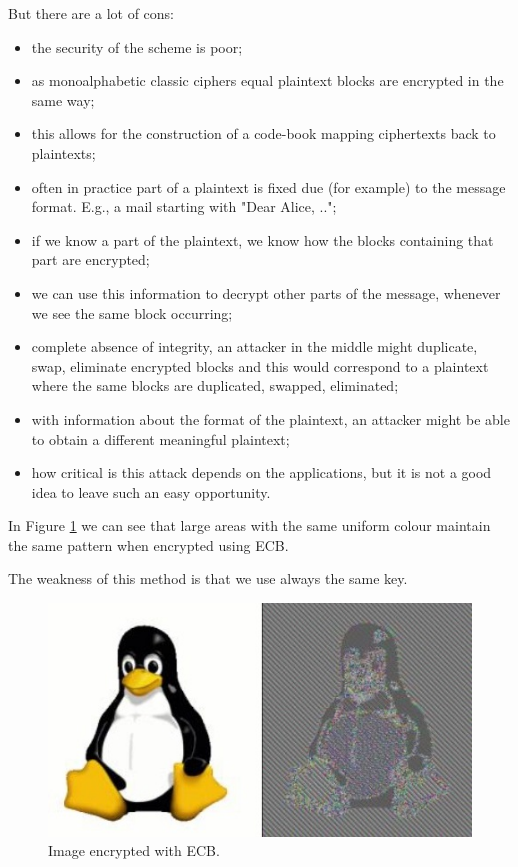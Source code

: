\documentclass[a4paper, 12pt]{report}
\begin{document}
But there are a lot of cons:
\begin{itemize}
	\item the security of the scheme is poor;
	\item as monoalphabetic classic ciphers equal plaintext blocks are encrypted in the same way;
	\item this allows for the construction of a code-book mapping ciphertexts back to plaintexts;
	\item often in practice part of a plaintext is fixed due (for example) to the message format. E.g., a mail starting with "Dear Alice, ..";
	\item if we know a part of the plaintext, we know how the blocks containing that part are encrypted;
	\item we can use this information to decrypt other parts of the message, whenever we see the same block occurring;
	\item complete absence of integrity, an attacker in the middle might duplicate, swap, eliminate encrypted blocks and this would correspond to a plaintext where the same blocks are duplicated, swapped, eliminated;
	\item with information about the format of the plaintext, an attacker might be able to obtain a different meaningful plaintext;
	\item how critical is this attack depends on the applications, but it is not a good idea to leave such an easy opportunity.
\end{itemize}
	
In Figure \ref{fig:exampleImageECB} we can see that large areas with the same uniform colour maintain the same pattern when encrypted using ECB.

The weakness of this method is that we use always the same key.
\begin{figure}[H]
	\centering
	\includegraphics[scale=0.7]{images/Lec9/imageECB.png}
	\caption{Image encrypted with ECB.}
	\label{fig:exampleImageECB}
\end{figure}
\end{document}
